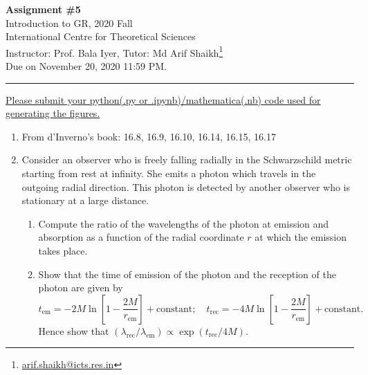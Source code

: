 \documentclass{article}
\begin{document}
\begin{center}
  {\bfseries Assignment \#5}\\
  Introduction to GR, 2020 Fall\\
  International Centre for Theoretical Sciences\\
  Instructor: Prof. Bala Iyer, Tutor: Md Arif Shaikh\footnote{\href{mailto: arif.shaikh@icts.res.in}{arif.shaikh@icts.res.in}}\\
  Due on November 20, 2020 11:59 PM.
\end{center}
\hrule
\vspace{0.5cm}
\underline{\color{red}Please submit your python(.py or .ipynb)/mathematica(.nb) code used for generating the figures.}

\begin{enumerate}
\item From d'Inverno's book: 16.8, 16.9, 16.10, 16.14, 16.15, 16.17
\item Consider an observer who is freely falling radially in the Schwarzschild metric starting from rest at infinity. She emits a photon which travels in the outgoing radial direction. This photon is detected by another observer who is stationary at a large distance.
  \begin{enumerate}
  \item Compute the ratio of the wavelengths of the photon at emission and absorption as a function of the radial coordinate $r$ at which the emission takes place.
  \item Show that the time of emission of the photon and the reception of the photon are given by
    \begin{equation}
      \label{eq:t_em}
      t_{\text{em}}=-2M\ln\left[1-\frac{2M}{r_{\text{em}}}\right] + \text{constant};\quad t_{\text{rec}}=-4M\ln\left[1-\frac{2M}{r_{\text{em}}}\right] + \text{constant}.
    \end{equation}
    Hence show that $(\lambda_{\text{rec}}/\lambda_{\text{em}}) \propto \exp(t_{\text{rec}}/4M)$.
  \end{enumerate}


\end{enumerate}
\end{document}
